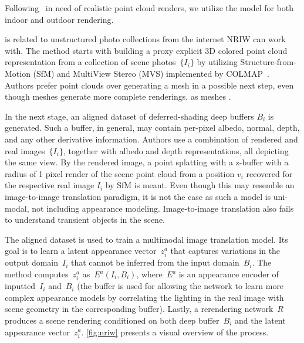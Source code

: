 Following~\citep{Bastien} in need of realistic point cloud renders, we utilize the model for
both indoor and outdoor rendering.

 is related to unstructured photo collections from the internet NRIW can work with.
The method starts with building a proxy explicit 3D colored point cloud representation from a collection of
scene photos~$\{I_i\}$ by utilizing Structure-from-Motion (SfM) and MultiView Stereo (MVS) implemented by
COLMAP~\citep{schoenberger2016sfm, schoenberger2016mvs}. Authors prefer point clouds over generating a mesh
in a possible next step, even though meshes generate more complete renderings, as meshes . 

In the next stage, an aligned dataset of deferred-shading deep buffers $B_i$ is generated. Such a buffer,
in general, may contain per-pixel albedo, normal, depth, and any other derivative information. Authors use
a combination of rendered and real images~$\{I_i\}$, together with albedo and depth representations, all
depicting the same view. By the rendered image, a point splatting with a z-buffer with a radius of 1 pixel
render of the scene point cloud from a position $v_i$ recovered for the respective real image $I_i$ by SfM
is meant. Even though this may resemble an image-to-image translation paradigm, it is not the case as
such a model is uni-modal, not including appearance modeling. Image-to-image translation also fails to
understand transient objects in the scene.

The aligned dataset is used to train a multimodal image translation model. Its goal is to learn
a latent appearance vector~$z^a_i$ that captures variations in the output domain~$I_i$ that cannot be
inferred from the input domain~$B_i$. The method computes~$z^a_i$ as~$E^a(I_i, B_i)$, where~$E^a$ is
an appearance encoder of inputted~$I_i$ and~$B_i$ (the buffer is used for allowing the network to learn
more complex appearance models by correlating the lighting in the real image with scene geometry in the
corresponding buffer). Lastly, a rerendering network~$R$ produces a scene rendering conditioned
on both deep buffer~$B_i$ and the latent appearance vector~$z^a_i$. \cref{fig:nriw} presents a visual
overview of the process.

